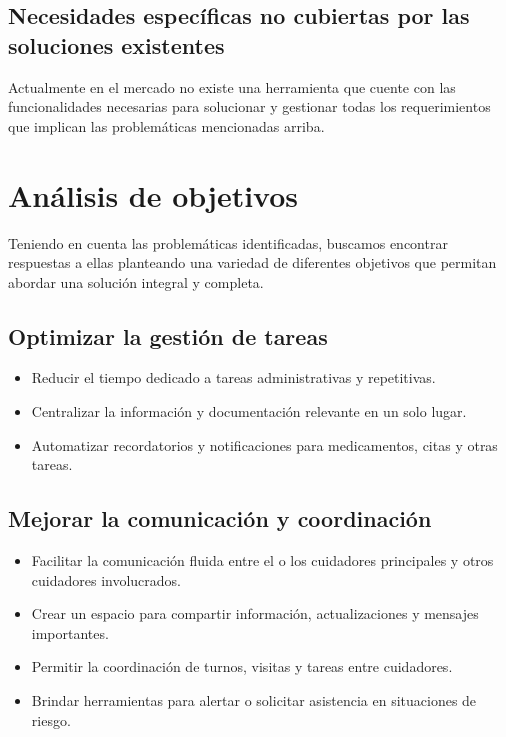 \documentclass[a4paper,12pt]{article}
\begin{document}
    \subsection{Necesidades específicas no cubiertas por las soluciones existentes}
    \par Actualmente en el mercado no existe una herramienta que cuente con las funcionalidades necesarias para solucionar y gestionar todas los requerimientos que implican las problemáticas mencionadas arriba. 

    \newpage

    \section{Análisis de objetivos}
    \par Teniendo en cuenta las problemáticas identificadas, buscamos encontrar respuestas a ellas planteando una variedad de diferentes objetivos que permitan abordar una solución integral y completa.
    \subsection{Optimizar la gestión de tareas}
    \begin{itemize}
        \item Reducir el tiempo dedicado a tareas administrativas y repetitivas.
        \item Centralizar la información y documentación relevante en un solo lugar.
        \item Automatizar recordatorios y notificaciones para medicamentos, citas y otras tareas.
    \end{itemize}
    \subsection{Mejorar la comunicación y coordinación}
    \begin{itemize}
        \item Facilitar la comunicación fluida entre el o los cuidadores principales y otros cuidadores involucrados.
        \item Crear un espacio para compartir información, actualizaciones y mensajes importantes.
        \item Permitir la coordinación de turnos, visitas y tareas entre cuidadores.
        \item Brindar herramientas para alertar o solicitar asistencia en situaciones de riesgo.
    \end{itemize}
\end{document}
